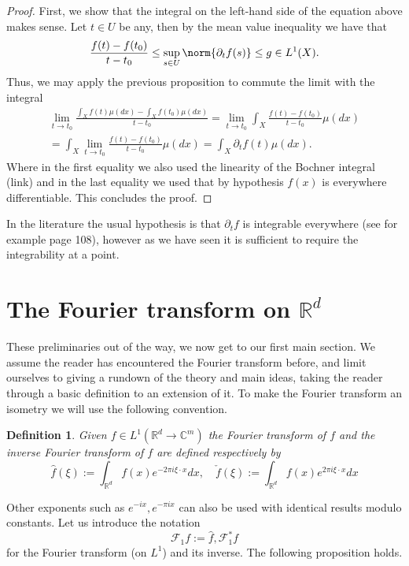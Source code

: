 \documentclass[
]{article}
\begin{document}
\emph{Proof.} First, we show that the integral on the left-hand side of
the equation above makes sense. Let \(t\in U\) be any, then by the mean
value inequality we have that
\[\frac{f(t)-f(t_0)}{t-t_0}\leq \sup_{s \in U}\norm{\partial _t f(s)}\leq g \in L^1(X).\]
Thus, we may apply the previous proposition to commute the limit with
the integral \[\begin{gathered}
        \lim_{t \to t_0}\frac{\int_{X} f(t)\mu (dx)-\int_{X}f(t_0) \mu (dx)}{t-t_0}  =\lim_{t \to t_0}\int_{X}    \frac{f(t)-f(t_0)}{t-t_0} \mu (dx) \\=\int_{X}\lim_{t \to t_0} \frac{f(t)-f(t_0)}{t-t_0} \mu (dx) =\int_{X}\partial _t f(t) \mu(dx).
    \end{gathered}\] Where in the first equality we also used the
linearity of the Bochner integral (link) and in the last equality we
used that by hypothesis \(f(x)\) is everywhere differentiable. This
concludes the proof.~◻

In the literature the usual hypothesis is that \(\partial _t f\) is
integrable everywhere (see for example \cite{FF} page 108), however as
we have seen it is sufficient to require the integrability at a point.

\hypertarget{the-fourier-transform-on-mathbb-rd}{%
\section{\texorpdfstring{The Fourier transform on
\({\mathbb R}^d\)}{The Fourier transform on \{\textbackslash mathbb R\}\^{}d}}\label{the-fourier-transform-on-mathbb-rd}}

These preliminaries out of the way, we now get to our first main
section. We assume the reader has encountered the Fourier transform
before, and limit ourselves to giving a rundown of the theory and main
ideas, taking the reader through a basic definition to an extension of
it. To make the Fourier transform an isometry we will use the following
convention.

\textbf{Definition 1}. \emph{Given
\(f\in L^1({\mathbb R}^d\to\mathbb{C}^m)\) the \emph{Fourier transform}
of \(f\) and the \emph{inverse Fourier transform of} \(f\) are defined
respectively by
\[\hat{f}(\xi):=\int_{{\mathbb R}^d}f(x)e^{-2\pi i\xi\cdot  x} dx, \quad \check{f}(\xi):=\int_{{\mathbb R}^d}f(x)e^{2\pi i\xi\cdot  x} dx\]}

Other exponents such as \(e^{-ix}, e^{-\pi i x}\) can also be used with
identical results modulo constants. Let us introduce the notation
\[\mathcal{F}_1 f:=\hat{f}, \mathcal{F}_1^*f\] for the Fourier transform
(on \(L^1\)) and its inverse. The following proposition holds.
\end{document}
